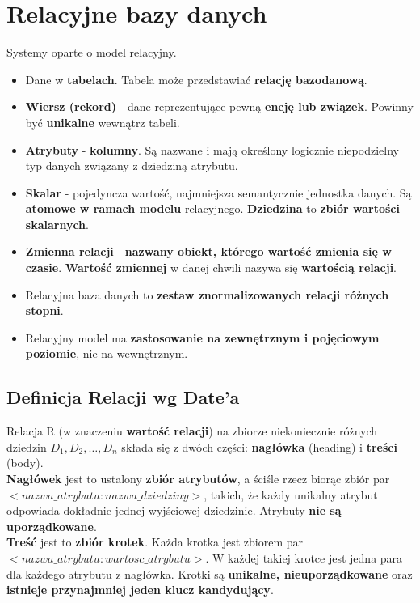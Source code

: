 \documentclass[a4paper]{article}
\begin{document}
\section{Relacyjne bazy danych}
Systemy oparte o model relacyjny.
\begin{itemize}
    \item Dane w \textbf{tabelach}. Tabela może przedstawiać \textbf{relację bazodanową}. 
    \item \textbf{Wiersz (rekord)} - dane reprezentujące pewną \textbf{encję lub związek}. Powinny być \textbf{unikalne} wewnątrz tabeli.
    \item \textbf{Atrybuty} - \textbf{kolumny}. Są nazwane i mają określony logicznie niepodzielny typ danych związany z dziedziną atrybutu.
    \item \textbf{Skalar} - pojedyncza wartość, najmniejsza semantycznie jednostka danych. Są \textbf{atomowe w ramach modelu} relacyjnego.
    \textbf{Dziedzina} to \textbf{zbiór wartości skalarnych}.
    \item \textbf{Zmienna relacji} - \textbf{nazwany obiekt, którego wartość zmienia się w czasie}. \textbf{Wartość  zmiennej} w danej chwili nazywa się \textbf{wartością relacji}.
    \item Relacyjna baza danych to \textbf{zestaw znormalizowanych relacji różnych stopni}. 
    \item Relacyjny model ma \textbf{zastosowanie na zewnętrznym i pojęciowym poziomie}, nie na wewnętrznym.
\end{itemize}

\subsection{Definicja Relacji wg Date'a}
Relacja R (w znaczeniu \textbf{wartość relacji}) na zbiorze niekoniecznie różnych dziedzin $D_1, D_2,\dots, D_n$ składa się z dwóch części: \textbf{nagłówka} (heading) i
\textbf{treści} (body).\\

\textbf{Nagłówek} jest to ustalony \textbf{zbiór atrybutów}, a ściśle rzecz biorąc zbiór par $<nazwa\_atrybutu : nazwa\_dziedziny>$, takich, że każdy unikalny atrybut odpowiada dokładnie jednej wyjściowej dziedzinie. Atrybuty \textbf{nie są uporządkowane}.\\

\textbf{Treść} jest to \textbf{zbiór krotek}. Każda krotka jest zbiorem par $<nazwa\_atrybutu : wartosc\_atrybutu>$. W każdej takiej krotce jest jedna para dla każdego atrybutu z nagłówka. Krotki są \textbf{unikalne, nieuporządkowane} oraz \textbf{istnieje przynajmniej jeden klucz kandydujący}.\\
\end{document}
